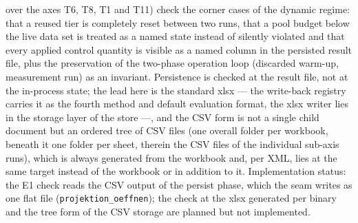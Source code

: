 \begin{nurlang}
over the axes T6, T8, T1 and T11) check the corner cases of the dynamic regime: that a reused tier is
completely reset between two runs, that a pool budget below the live data set is treated as a named
state instead of silently violated and that every applied control quantity is visible as a named column
in the persisted result file, plus the preservation of the two-phase operation loop (discarded warm-up,
measurement run) as an invariant.
Persistence is checked at the result file, not at the in-process state; the lead here is the standard
xlsx --- the write-back registry carries it as the fourth method and default evaluation format, the
xlsx writer lies in the storage layer of the store ---, and the CSV form is not a single child document
but an ordered tree of CSV files (one overall folder per workbook, beneath it one folder per sheet,
therein the CSV files of the individual sub-axis runs), which is always generated from the workbook
and, per XML, lies at the same target instead of the workbook or in addition to it. Implementation
status: the E1 check reads the CSV output of the persist phase, which the seam writes as one flat file
(\texttt{projektion\_\allowbreak{}oeffnen}); the check at the xlsx generated per binary and the tree
form of the CSV storage are planned but not implemented.


\end{nurlang}
